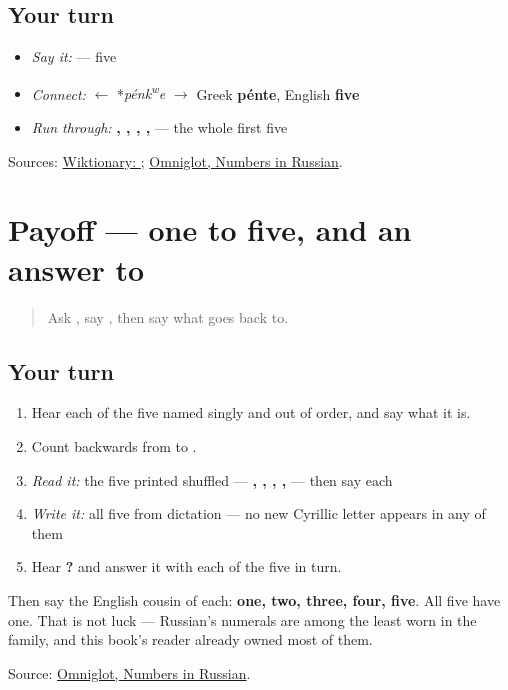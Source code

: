 \subsection*{Your turn}
\begin{itemize}
\raggedright
  \item \emph{Say it:} \textbf{} — five
  \item \emph{Connect:} \textbf{} $\leftarrow$ *\emph{pénk\textsuperscript{w}e} $\to$ Greek \textbf{pénte}, English \textbf{five}
  \item \emph{Run through:} \textbf{, , , , } — the whole first five
\end{itemize}

\begin{tcolorbox}[breakable,colback=teal!4,colframe=teal!35!black,title={Before you move on}]
Sources: \href{https://en.wiktionary.org/wiki/\%D0\%BF\%D1\%8F\%D1\%82\%D1\%8C}{Wiktionary: }; \href{https://www.omniglot.com/language/numbers/russian.htm}{Omniglot, Numbers in Russian}.
\end{tcolorbox}
\section[Practice]{Payoff — one to five, and an answer to }

\label{lesson:RU-C23-practice}



\begin{quote}
Ask \textbf{}, say \textbf{}, then say what \textbf{} goes back to.
\end{quote}

\subsection*{Your turn}
\begin{enumerate}
\raggedright
  \item Hear each of the five named singly and out of order, and say what it is.
  \item Count backwards from \textbf{} to \textbf{}.
  \item \emph{Read it:} the five printed shuffled — \textbf{, , , , } — then say each
  \item \emph{Write it:} all five from dictation — no new Cyrillic letter appears in any of them
  \item Hear \textbf{?} and answer it with each of the five in turn.
\end{enumerate}

Then say the English cousin of each: \textbf{one, two, three, four, five}. All five have one. That is not luck — Russian's numerals are among the least worn in the family, and this book's reader already owned most of them.

\begin{tcolorbox}[breakable,colback=teal!4,colframe=teal!35!black,title={Before you move on}]
Source: \href{https://www.omniglot.com/language/numbers/russian.htm}{Omniglot, Numbers in Russian}.
\end{tcolorbox}
